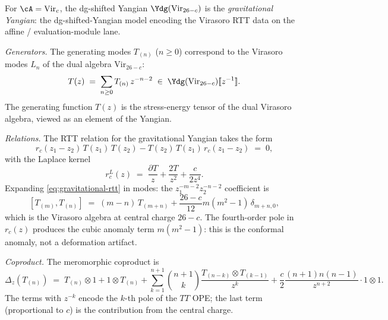 \begin{construction}
For $\cA=\mathrm{Vir}_c$, the dg-shifted Yangian
$\Ydg(\mathrm{Vir}_{26-c})$ is the
\emph{gravitational Yangian}: the dg-shifted-Yangian model encoding the
Virasoro RTT data on the affine / evaluation-module lane.

\emph{Generators.} The generating modes
$T_{(n)}$ ($n\ge 0$) correspond to the Virasoro modes
$L_n$ of the dual algebra $\mathrm{Vir}_{26-c}$:
\begin{equation}
T(z)
\;=\;
\sum_{n\ge 0}T_{(n)}\,z^{-n-2}
\;\in\;
\Ydg(\mathrm{Vir}_{26-c})[\![z^{-1}]\!].
\end{equation}
The generating function $T(z)$ is the stress-energy
tensor of the dual Virasoro algebra, viewed as an
element of the Yangian.

\emph{Relations.} The RTT relation for the gravitational
Yangian takes the form
\begin{equation}
r_c(z_1{-}z_2)\,T(z_1)\,T(z_2)
-T(z_2)\,T(z_1)\,r_c(z_1{-}z_2)
\;=\;0,
\end{equation}
with the Laplace kernel
\begin{equation}
r^L_c(z)
\;=\;
\frac{\partial T}{z}
+\frac{2T}{z^2}
+\frac{c}{2z^4}.
\end{equation}
Expanding \eqref{eq:gravitational-rtt} in modes:
the $z_1^{-m-2}z_2^{-n-2}$ coefficient is
\begin{equation}
[T_{(m)},T_{(n)}]
\;=\;
(m-n)\,T_{(m+n)}
+\frac{26-c}{12}m(m^2-1)\,\delta_{m+n,0},
\end{equation}
which is the Virasoro algebra at central charge $26-c$.
The fourth-order pole in $r_c(z)$ produces the cubic
anomaly term $m(m^2-1)$: this is the conformal anomaly,
not a deformation artifact.

\emph{Coproduct.} The meromorphic coproduct is
\begin{equation}
\Delta_z(T_{(n)})
\;=\;
T_{(n)}\otimes 1+1\otimes T_{(n)}
+\sum_{k=1}^{n+1}\binom{n+1}{k}
\frac{T_{(n-k)}\otimes T_{(k-1)}}{z^{k}}
+\frac{c}{2}\frac{(n+1)n(n-1)}{z^{n+2}}\cdot 1\otimes 1.
\end{equation}
The terms with $z^{-k}$ encode the $k$-th pole of the
$TT$ OPE; the last term (proportional to $c$) is the
contribution from the central charge.
\end{construction}

